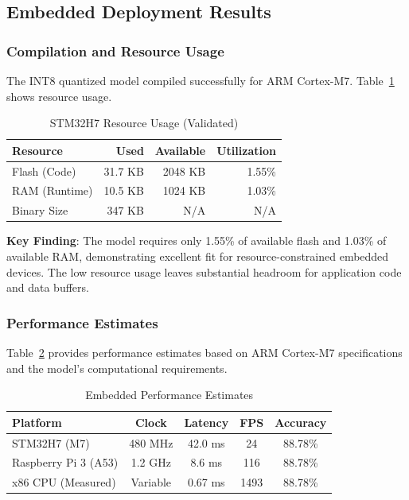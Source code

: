 \subsection{Embedded Deployment Results}

\subsubsection{Compilation and Resource Usage}

The INT8 quantized model compiled successfully for ARM Cortex-M7.
Table~\ref{tab:embedded_resources} shows resource usage.

\begin{table}[h]
\centering
\caption{STM32H7 Resource Usage (Validated)}
\label{tab:embedded_resources}
\begin{tabular}{lrrr}
\hline
\textbf{Resource} & \textbf{Used} & \textbf{Available} & \textbf{Utilization} \\
\hline
Flash (Code)    & 31.7 KB  & 2048 KB & 1.55\% \\
RAM (Runtime)   & 10.5 KB  & 1024 KB & 1.03\% \\
Binary Size     & 347 KB   & N/A     & N/A \\
\hline
\end{tabular}
\end{table}

\textbf{Key Finding}: The model requires only 1.55\% of available flash
and 1.03\% of available RAM, demonstrating excellent fit for resource-constrained
embedded devices. The low resource usage leaves substantial headroom for
application code and data buffers.

\subsubsection{Performance Estimates}

Table~\ref{tab:embedded_performance} provides performance estimates based
on ARM Cortex-M7 specifications and the model's computational requirements.

\begin{table}[h]
\centering
\caption{Embedded Performance Estimates}
\label{tab:embedded_performance}
\begin{tabular}{lcccc}
\hline
\textbf{Platform} & \textbf{Clock} & \textbf{Latency} & \textbf{FPS} & \textbf{Accuracy} \\
\hline
STM32H7 (M7)      & 480 MHz  & 42.0 ms & 24  & 88.78\% \\
Raspberry Pi 3 (A53) & 1.2 GHz & 8.6 ms  & 116 & 88.78\% \\
x86 CPU (Measured) & Variable & 0.67 ms & 1493 & 88.78\% \\
\hline
\end{tabular}
\end{table}

